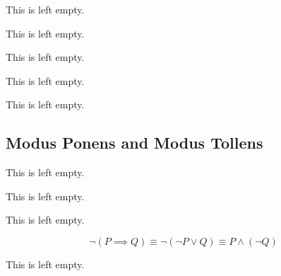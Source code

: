 \begin{remark}
    This is left empty.
\end{remark}

\begin{example}
    This is left empty.
\end{example}

\begin{example}
    This is left empty.
\end{example}

\begin{example}
    This is left empty.
\end{example}

\begin{remark}
    This is left empty.
\end{remark}

\subsection{Modus Ponens and Modus Tollens}

\begin{definition}
    This is left empty.
\end{definition}

\begin{example}
    This is left empty.
\end{example}

\begin{remark}
    This is left empty.
\end{remark}

\begin{example}
\end{example}

\begin{equation}
    \neg(P \implies Q)  \equiv \neg(\neg P \lor Q) \equiv P \land (\neg Q)
    \label{eq:negimplies}
\end{equation}

\begin{definition}
    This is left empty.
\end{definition}